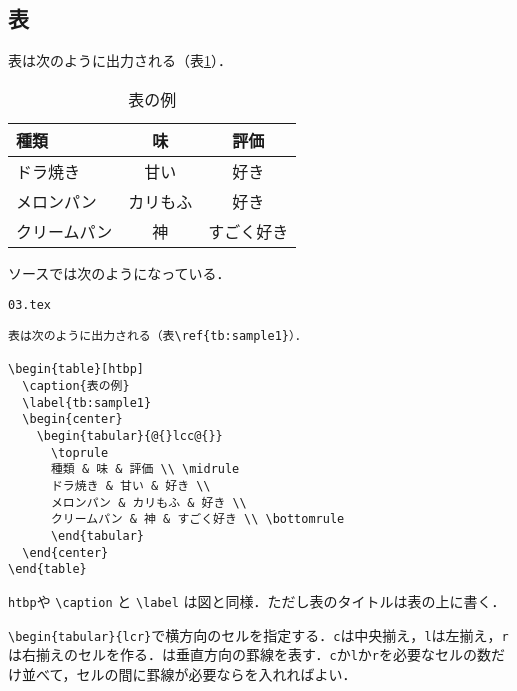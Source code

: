 \subsection{表}

表は次のように出力される（表\ref{tb:sample1}）．

\begin{table}[htbp]
  \caption{表の例}
  \label{tb:sample1}
  \begin{center}
    \begin{tabular}{@{}lcc@{}}
      \toprule
      種類 & 味 & 評価 \\ \midrule
      ドラ焼き & 甘い & 好き \\
      メロンパン & カリもふ & 好き \\
      クリームパン & 神 & すごく好き \\ \bottomrule
      \end{tabular}
  \end{center}
\end{table}

ソースでは次のようになっている．

\begin{itembox}[l]{\texttt{03.tex}}
\begin{verbatim}
表は次のように出力される（表\ref{tb:sample1}）．

\begin{table}[htbp]
  \caption{表の例}
  \label{tb:sample1}
  \begin{center}
    \begin{tabular}{@{}lcc@{}}
      \toprule
      種類 & 味 & 評価 \\ \midrule
      ドラ焼き & 甘い & 好き \\
      メロンパン & カリもふ & 好き \\
      クリームパン & 神 & すごく好き \\ \bottomrule
      \end{tabular}
  \end{center}
\end{table}
\end{verbatim}
\end{itembox}

\texttt{htbp}や \verb|\caption| と \verb|\label| は図と同様．ただし表のタイトルは表の上に書く．

\verb|\begin{tabular}{l|\texttt{\textbar}\texttt{c}\texttt{\textbar}\verb|r}|で横方向のセルを指定する．\texttt{c}は中央揃え，\texttt{l}は左揃え，\texttt{r}は右揃えのセルを作る．\texttt{\textbar}は垂直方向の罫線を表す．\texttt{c}か\texttt{l}か\texttt{r}を必要なセルの数だけ並べて，セルの間に罫線が必要なら\texttt{\textbar}を入れればよい．


